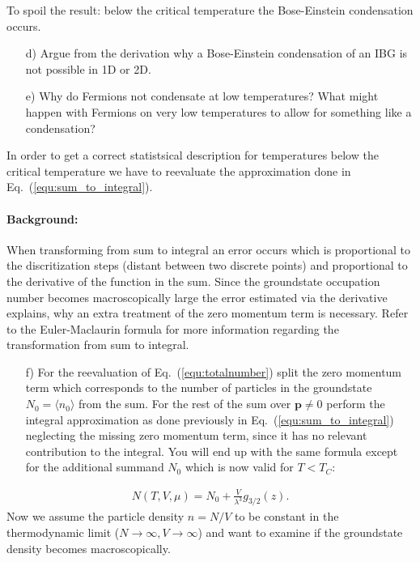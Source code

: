 \documentclass[12pt,a4paper]{article} %
\begin{document}
To spoil the result: below the critical temperature the Bose-Einstein condensation occurs.

\begin{itemize}
 \item[d)] Argue from the derivation why a Bose-Einstein condensation of an IBG is not possible in 1D or 2D.
\end{itemize}

\begin{itemize}
 \item[e)] Why do Fermions not condensate at low temperatures? What might happen with Fermions on very low temperatures to allow for something like a condensation?
\end{itemize}

In order to get a correct statistsical description for temperatures below the critical temperature we have to reevaluate the approximation done in Eq.~(\ref{equ:sum_to_integral}).  \paragraph{Background:} When transforming from sum to integral an error occurs which is proportional to the discritization steps (distant between two discrete points) and proportional to the derivative of the function in the sum. Since the groundstate occupation number becomes macroscopically large the error estimated via the derivative explains, why an extra treatment of the zero momentum term is necessary. Refer to the Euler-Maclaurin formula for more information regarding the transformation from sum to integral.
\begin{itemize} 
 \item[f)] For the reevaluation of Eq.~(\ref{equ:totalnumber}) split the zero momentum term which corresponds to the number of particles in the groundstate $N_0 = \langle n_0\rangle$ from the sum. For the rest of the sum over $\boldsymbol{p}\neq 0$ perform the integral approximation as done previously in Eq.~(\ref{equ:sum_to_integral}) neglecting the missing zero momentum term, since it has no relevant contribution to the integral. You will end up with the same formula except for the additional summand $N_0$ which is now valid for $T < T_C$:
\end{itemize}
\begin{align}
 N(T, V, \mu) = N_0 + \frac{V}{\lambda^3} g_{3/2}(z).
\end{align}
Now we assume the particle density $n = N/V $ to be constant in the thermodynamic limit ($N\rightarrow \infty, V\rightarrow \infty$) and want to examine if the groundstate density becomes macroscopically. 
\end{document}

